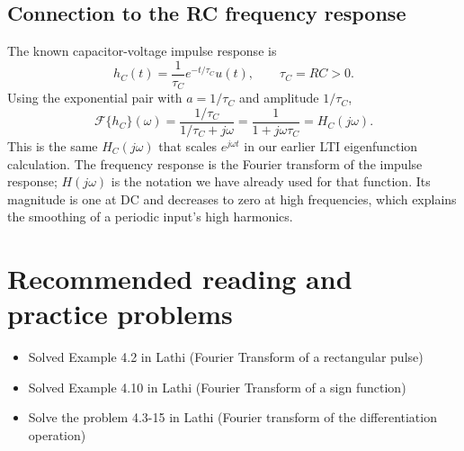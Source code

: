 \subsection{Connection to the RC frequency response}
The known capacitor-voltage impulse response is
\[
h_C(t)=\frac1{\tau_C}e^{-t/\tau_C}u(t),\qquad \tau_C=RC>0.
\]
Using the exponential pair with $a=1/\tau_C$ and amplitude $1/\tau_C$,
\[
\mathcal F\{h_C\}(\omega)=\frac{1/\tau_C}{1/\tau_C+j\omega}
=\frac1{1+j\omega\tau_C}=H_C(j\omega).
\]
This is the same $H_C(j\omega)$ that scales $e^{j\omega t}$ in our
earlier LTI eigenfunction calculation. The frequency response is the
Fourier transform of the impulse response; $H(j\omega)$ is the notation
we have already used for that function.
Its magnitude is one at DC and decreases to zero at high frequencies,
which explains the smoothing of a periodic input's high harmonics.

\section{Recommended reading and practice problems}
\begin{itemize}
    \item Solved Example 4.2 in Lathi (Fourier Transform of a rectangular pulse)
    \item Solved Example 4.10 in Lathi (Fourier Transform of a sign function)
    \item Solve the problem 4.3-15 in Lathi (Fourier transform of the differentiation operation)
\end{itemize}
